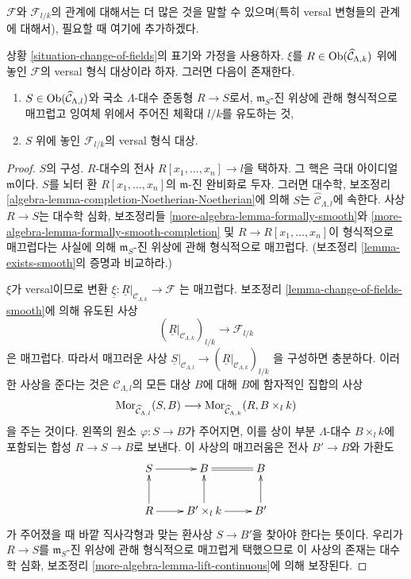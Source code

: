 \noindent
$\mathcal{F}$와 $\mathcal{F}_{l/k}$의 관계에 대해서는 더 많은 것을 말할 수
있으며(특히 versal 변형들의 관계에 대해서), 필요할 때 여기에 추가하겠다.

\begin{lemma}
\label{lemma-change-of-field-versal-ring}
상황 \ref{situation-change-of-fields}의 표기와 가정을 사용하자.
$\xi$를 $R \in \mathop{\mathrm{Ob}}\nolimits(\widehat{\mathcal{C}}_{\Lambda, k})$ 위에 놓인
$\mathcal{F}$의 versal 형식 대상이라 하자. 그러면 다음이 존재한다.
\begin{enumerate}
\item $S \in \mathop{\mathrm{Ob}}\nolimits(\widehat{\mathcal{C}}_{\Lambda, l})$와 국소
$\Lambda$-대수 준동형 $R \to S$로서, $\mathfrak m_S$-진 위상에 관해
형식적으로 매끄럽고 잉여체 위에서 주어진 체확대 $l/k$를 유도하는 것,
\item $S$ 위에 놓인 $\mathcal{F}_{l/k}$의 versal 형식 대상.
\end{enumerate}
\end{lemma}

\begin{proof}
$S$의 구성. $R$-대수의 전사 $R[x_1, \ldots, x_n] \to l$을 택하자.
그 핵은 극대 아이디얼 $\mathfrak m$이다. $S$를 뇌터 환
$R[x_1, \ldots, x_n]$의 $\mathfrak m$-진 완비화로 두자. 그러면
대수학, 보조정리 \ref{algebra-lemma-completion-Noetherian-Noetherian}에 의해
$S$는 $\widehat{\mathcal{C}}_{\Lambda, l}$에 속한다. 사상 $R \to S$는
대수학 심화, 보조정리들
\ref{more-algebra-lemma-formally-smooth}와
\ref{more-algebra-lemma-formally-smooth-completion} 및
$R \to R[x_1, \ldots, x_n]$이 형식적으로 매끄럽다는 사실에 의해
$\mathfrak m_S$-진 위상에 관해 형식적으로 매끄럽다.
(보조정리 \ref{lemma-exists-smooth}의 증명과 비교하라.)

\medskip\noindent
$\xi$가 versal이므로 변환
$\underline{\xi} : \underline{R}|_{\mathcal{C}_{\Lambda, k}} \to \mathcal{F}$
는 매끄럽다. 보조정리 \ref{lemma-change-of-fields-smooth}에 의해 유도된 사상
$$
(\underline{R}|_{\mathcal{C}_{\Lambda, k}})_{l/k}
\longrightarrow
\mathcal{F}_{l/k}
$$
은 매끄럽다. 따라서 매끄러운 사상
$\underline{S}|_{\mathcal{C}_{\Lambda, l}} \to
(\underline{R}|_{\mathcal{C}_{\Lambda, k}})_{l/k}$
을 구성하면 충분하다. 이러한 사상을 준다는 것은
$\mathcal{C}_{\Lambda, l}$의 모든 대상 $B$에 대해 $B$에 함자적인 집합의 사상
$$
\mathop{\mathrm{Mor}}\nolimits_{\widehat{\mathcal{C}}_{\Lambda, l}}(S, B)
\longrightarrow
\mathop{\mathrm{Mor}}\nolimits_{\widehat{\mathcal{C}}_{\Lambda, k}}(R, B \times_l k)
$$
을 주는 것이다. 왼쪽의 원소 $\varphi : S \to B$가 주어지면, 이를
상이 부분 $\Lambda$-대수 $B \times_l k$에 포함되는 합성
$R \to S \to B$로 보낸다. 이 사상의 매끄러움은 전사
$B' \to B$와 가환도
$$
\xymatrix{
S \ar[r] & B \ar@{=}[r] & B \\
R \ar[u] \ar[r] & B' \times_l k \ar[u] \ar[r] & B' \ar[u]
}
$$
가 주어졌을 때 바깥 직사각형과 맞는 환사상 $S \to B'$을 찾아야 한다는
뜻이다. 우리가 $R \to S$를 $\mathfrak m_S$-진 위상에 관해 형식적으로
매끄럽게 택했으므로 이 사상의 존재는 대수학 심화, 보조정리
\ref{more-algebra-lemma-lift-continuous}에 의해 보장된다.
\end{proof}







